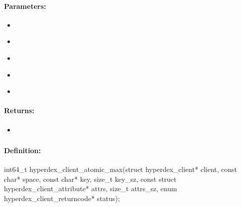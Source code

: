 \paragraph{Parameters:}
\begin{itemize}[noitemsep]
\item {}\\

\item {}\\

\item {}\\

\item {}\\

\item {}\\

\end{itemize}

\paragraph{Returns:}
\begin{itemize}[noitemsep]
\item {}\\

\end{itemize}

\pagebreak
\subsubsection{}
\label{api:c:atomic_max}


\paragraph{Definition:}
\begin{ccode}
int64_t hyperdex_client_atomic_max(struct hyperdex_client* client,
        const char* space,
        const char* key, size_t key_sz,
        const struct hyperdex_client_attribute* attrs, size_t attrs_sz,
        enum hyperdex_client_returncode* status);
\end{ccode}

